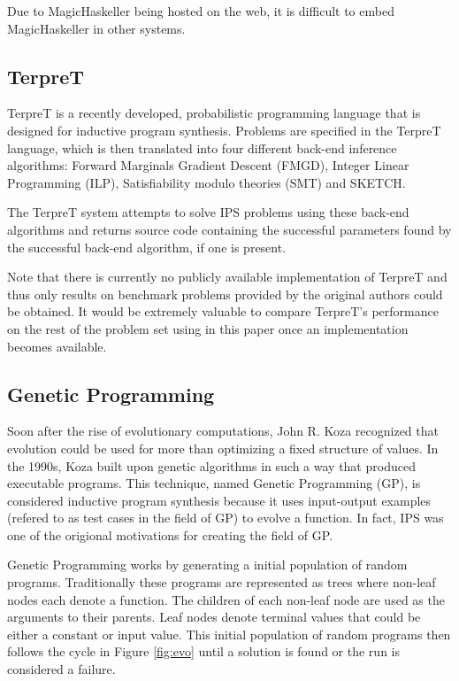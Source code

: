Due to MagicHaskeller being hosted on the web, it is difficult to embed MagicHaskeller in other systems.

\subsection{TerpreT}

TerpreT is a recently developed, probabilistic programming language that is designed for inductive program synthesis. Problems are specified in the TerpreT language, which is then translated into four different back-end inference algorithms: Forward Marginals Gradient Descent (FMGD), Integer Linear Programming (ILP), Satisfiability modulo theories (SMT) and SKETCH.

The TerpreT system attempts to solve IPS problems using these back-end algorithms and returns source code containing the successful parameters found by the successful back-end algorithm, if one is present.

Note that there is currently no publicly available implementation of TerpreT and thus only results on benchmark problems provided by the original authors could be obtained. It would be extremely valuable to compare TerpreT's performance on the rest of the problem set using in this paper once an implementation becomes available.

\subsection{Genetic Programming}

Soon after the rise of evolutionary computations, John R. Koza recognized that evolution could be used for more than optimizing a fixed structure of values. In the 1990s, Koza built upon genetic algorithms in such a way that produced executable programs. This technique, named Genetic Programming (GP), is considered inductive program synthesis because it uses input-output examples (refered to as test cases in the field of GP) to evolve a function. In fact, IPS was one of the origional motivations for creating the field of GP\cite{Koza1992}. 

Genetic Programming works by generating a initial population of random programs. Traditionally these programs are represented as trees where non-leaf nodes each denote a function. The children of each non-leaf node are used as the arguments to their parents. Leaf nodes denote terminal values that could be either a constant or input value. This initial population of random programs then follows the cycle in Figure \ref{fig:evo}  until a solution is found or the run is considered a failure.

